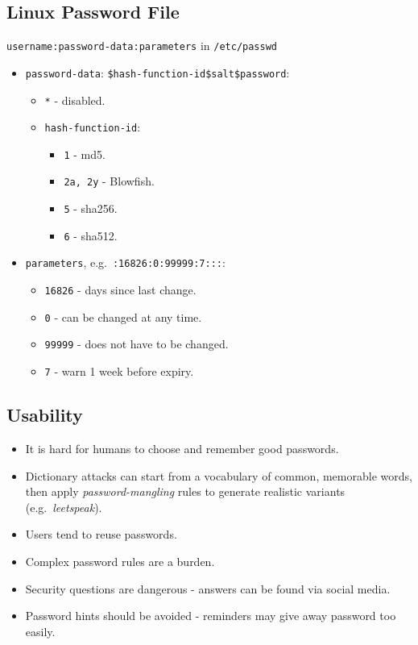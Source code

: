 \documentclass[11pt]{article}
\begin{document}
\subsection{Linux Password File}
\texttt{username:password-data:parameters} in \texttt{/etc/passwd}
\begin{itemize}
  \item \texttt{password-data}: \texttt{\$hash-function-id\$salt\$password}:
    \begin{itemize}
      \item \texttt{*} - disabled.
      \item \texttt{hash-function-id}:
      \begin{itemize}
        \item \texttt{1} - md5.
        \item \texttt{2a, 2y} - Blowfish.
        \item \texttt{5} - sha256.
        \item \texttt{6} - sha512.
      \end{itemize}
    \end{itemize}
  \item \texttt{parameters}, e.g.\ \texttt{:16826:0:99999:7:::}:
    \begin{itemize}
      \item \texttt{16826} - days since last change.
      \item \texttt{0} - can be changed at any time.
      \item \texttt{99999} - does not have to be changed.
      \item \texttt{7} - warn 1 week before expiry.
    \end{itemize}
\end{itemize}

\subsection{Usability}
\begin{itemize}
  \item It is hard for humans to choose and remember good passwords.
  \item Dictionary attacks can start from a vocabulary of common, memorable words, then apply \textit{password-mangling} rules to generate realistic variants (e.g.\ \textit{leetspeak}).
  \item Users tend to reuse passwords.
  \item Complex password rules are a burden.
  \item Security questions are dangerous - answers can be found via social media.
  \item Password hints should be avoided - reminders may give away password too easily.
\end{itemize}
\end{document}
